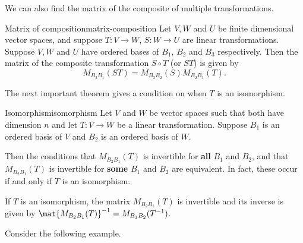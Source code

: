 We can also find the matrix of the composite of multiple transformations.

\begin{theorem}{Matrix of composition}{matrix-composition}
Let $V,W$ and $U$ be finite dimensional vector spaces, and suppose $T : V \to W$, $S: W \to U$ are linear transformations. 
Suppose $V, W$ and $U$ have ordered bases of $B_1$, $B_2$ and $B_3$ respectively.  Then the matrix of the composite transformation $S \circ T$ (or $ST$) is given by 
\[ M_{B_3B_1}(ST)=M_{B_3B_2}(S) M_{B_2B_1}(T).\]
\end{theorem}

The next important theorem gives a condition on when $T$ is an isomorphism.

\begin{theorem}{Isomorphism}{isomorphism}
Let $V$ and $W$ be vector spaces such that both have dimension $n$ and let $T: V \to W$ be a linear transformation. Suppose $B_1$ is an ordered basis of $V$ and $B_2$ is an ordered basis of $W$. 

 Then the conditions that $M_{B_2B_1}(T)$ is invertible for \textbf{all} $B_1$ and $B_2$, and that $M_{B_2B_1}(T)$ is invertible for \textbf{some} $B_1$ and $B_2$ are equivalent. In fact, these occur if and only if $T$ is an isomorphism. 

If $T$ is an isomorphism, the matrix $M_{B_2B_1}(T)$ is invertible and its inverse is given by $\mat{M_{B_2B_1}(T) } ^{-1} = M_{B_1B_2}(T^{-1})$.
\end{theorem}

Consider the following example.

